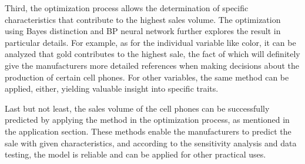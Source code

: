 Third, the optimization process allows the determination of specific characteristics that contribute to the highest sales volume. The optimization using Bayes distinction and BP neural network further explores the result in particular details. For example, as for the individual variable like color, it can be analyzed that gold contributes to the highest sale, the fact of which will definitely give the manufacturers more detailed references when making decisions about the production of certain cell phones. For other variables, the same method can be applied, either, yielding valuable insight into specific traits.

Last but not least, the sales volume of the cell phones can be successfully predicted by applying the method in the optimization process, as mentioned in the application section. These methods enable the manufacturers to predict the sale with given characteristics, and according to the sensitivity analysis and data testing, the model is reliable and can be applied for other practical uses.

